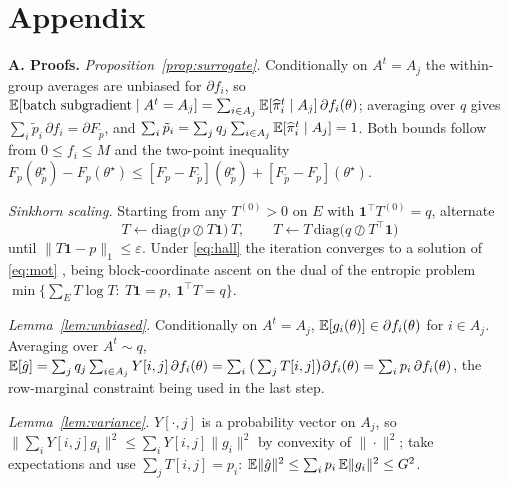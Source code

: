 \appendix
\section{Appendix}

\noindent\textbf{A. Proofs.}
\emph{Proposition~\ref{prop:surrogate}.} Conditionally on $A^t=A_j$ the
within-group averages are unbiased for $\partial f_i$, so
$\mathbb{E}[\text{batch subgradient}\mid A^t=A_j]=\sum_{i\in A_j}\mathbb{E}[\widehat\pi^t_i\mid A_j]\,\partial f_i(\theta)$;
averaging over $q$ gives $\sum_i\tilde p_i\,\partial f_i=\partial F_{\tilde p}$,
and $\sum_i\tilde p_i=\sum_j q_j\sum_{i\in A_j}\mathbb{E}[\widehat\pi^t_i\mid A_j]=1$.
Both bounds follow from $0\le f_i\le M$ and the two-point inequality
$F_p(\theta^\star_{\tilde p})-F_p(\theta^\star)\le
[F_p-F_{\tilde p}](\theta^\star_{\tilde p})+[F_{\tilde p}-F_p](\theta^\star)$.

\noindent\emph{Sinkhorn scaling.} Starting from any $T^{(0)}>0$ on $E$ with
$\mathbf{1}^\top T^{(0)}=q$, alternate
\begin{equation}
T\leftarrow\mathrm{diag}\big(p\oslash T\mathbf{1}\big)\,T,\qquad
T\leftarrow T\,\mathrm{diag}\big(q\oslash T^\top\mathbf{1}\big)
\label{eq:ipfp}
\end{equation}
until $\|T\mathbf{1}-p\|_1\le\varepsilon$. Under \eqref{eq:hall} the iteration
converges to a solution of \eqref{eq:mot} \cite{sinkhorn1967,csiszar1975},
being block-coordinate ascent on the dual of the entropic problem
$\min\{\sum_E T\log T:\ T\mathbf{1}=p,\ \mathbf{1}^\top T=q\}$.

\noindent\emph{Lemma~\ref{lem:unbiased}.} Conditionally on $A^t=A_j$,
$\mathbb{E}[g_i(\theta)]\in\partial f_i(\theta)$ for $i\in A_j$. Averaging over
$A^t\sim q$,
$\mathbb{E}[\hat g]=\sum_j q_j\sum_{i\in A_j}Y[i,j]\,\partial f_i(\theta)
=\sum_i\big(\sum_j T[i,j]\big)\partial f_i(\theta)=\sum_i p_i\,\partial f_i(\theta)$,
the row-marginal constraint being used in the last step.

\noindent\emph{Lemma~\ref{lem:variance}.} $Y[\cdot,j]$ is a probability vector
on $A_j$, so $\|\sum_i Y[i,j]g_i\|^2\le\sum_i Y[i,j]\|g_i\|^2$ by convexity of
$\|\cdot\|^2$; take expectations and use $\sum_j T[i,j]=p_i$:
$\mathbb{E}\|\hat g\|^2\le\sum_i p_i\,\mathbb{E}\|g_i\|^2\le G^2$.

